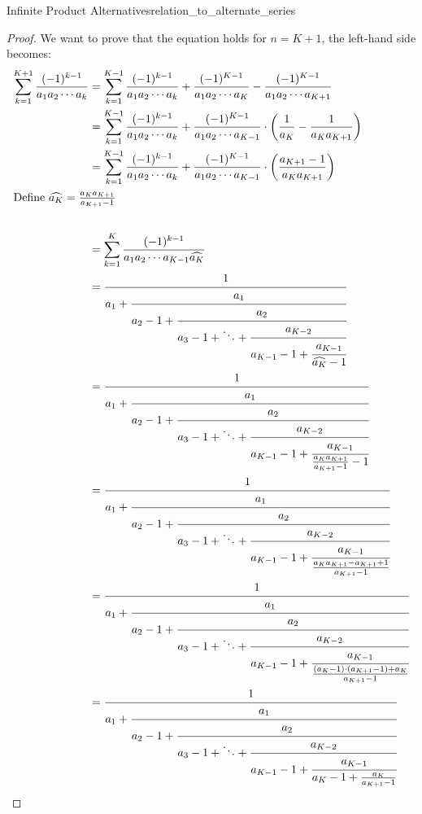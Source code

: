 \documentclass[a4paper]{article}
\begin{document}
\begin{mytheorem}{Infinite Product Alternatives}{relation_to_alternate_series}
\begin{proof}
    We want to prove that the equation holds for \( n = K+1 \), the left-hand side becomes:
    \begin{align*}
      \sum_{k=1}^{K+1} \frac{(-1)^{k-1}}{a_1 a_2 \cdots a_k} & = \sum_{k=1}^{K-1} \frac{(-1)^{k-1}}{a_1 a_2 \cdots a_k}
      + \frac{(-1)^{K-1}}{a_1 a_2 \cdots a_{K}}
      - \frac{(-1)^{K-1}}{a_1 a_2 \cdots a_{K+1}}
      \\
                                                             & = \sum_{k=1}^{K-1} \frac{(-1)^{k-1}}{a_1 a_2 \cdots a_k}
      + \frac{(-1)^{K-1}}{a_1 a_2 \cdots a_{K-1}} \cdot \left(\frac{1}{a_{K}} -  \frac{1}{a_{K} a_{K+1}} \right)
      \\
                                                             & = \sum_{k=1}^{K-1} \frac{(-1)^{k-1}}{a_1 a_2 \cdots a_k}
      + \frac{(-1)^{K-1}}{a_1 a_2 \cdots a_{K-1}} \cdot \left(\frac{a_{K+1} - 1}{a_{K} a_{K+1}} \right)
      \\
      \shortintertext{Define $\widehat{a_{K}} = \frac{a_{K} a_{K+1}}{a_{K+1} - 1}$}
      \\
                                                             & = \sum_{k=1}^{K} \frac{(-1)^{k-1}}{a_1 a_2 \cdots a_{K-1} \widehat{a_{K}}}
      \\
                                                             & = \cfrac{1}{a_1 + \cfrac{a_1}{a_2 - 1 + \cfrac{a_2}{a_3 - 1 + \ddots + \cfrac{a_{K-2}}{a_{K-1} - 1 +
              \cfrac{a_{K-1}}{\widehat{a_K} - 1}}}}}
      \\
                                                             & = \cfrac{1}{a_1 + \cfrac{a_1}{a_2 - 1 + \cfrac{a_2}{a_3 - 1 + \ddots + \cfrac{a_{K-2}}{a_{K-1} - 1 +
              \cfrac{a_{K-1}}{\frac{a_{K} a_{K+1}}{a_{K+1} - 1} - 1}}}}}
      \\
                                                             & = \cfrac{1}{a_1 + \cfrac{a_1}{a_2 - 1 + \cfrac{a_2}{a_3 - 1 + \ddots + \cfrac{a_{K-2}}{a_{K-1} - 1 +
              \cfrac{a_{K-1}}{\frac{a_{K} a_{K+1} - a_{K+1} + 1}{a_{K+1} - 1}}}}}}
      \\
                                                             & = \cfrac{1}{a_1 + \cfrac{a_1}{a_2 - 1 + \cfrac{a_2}{a_3 - 1 + \ddots + \cfrac{a_{K-2}}{a_{K-1} - 1 +
              \cfrac{a_{K-1}}{\frac{(a_{K} - 1) \cdot (a_{K+1} - 1) + a_{K}}{a_{K+1} - 1}}}}}}
      \\
                                                             & = \cfrac{1}{a_1 + \cfrac{a_1}{a_2 - 1 + \cfrac{a_2}{a_3 - 1 + \ddots + \cfrac{a_{K-2}}{a_{K-1} - 1 +
              \cfrac{a_{K-1}}{a_{K} - 1 + \frac{a_{K}}{a_{K+1} - 1}}}}}}
    \end{align*}

  \end{proof}
\end{mytheorem}
\end{document}
